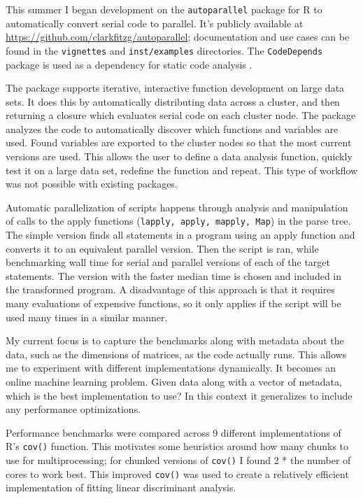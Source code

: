 \documentclass[12pt]{article}
\begin{document}
This summer I began development on the \texttt{autoparallel} package for R
to automatically convert serial code to parallel. It's publicly available
at \url{https://github.com/clarkfitzg/autoparallel}; documentation and use
cases can be found in the \texttt{vignettes} and \texttt{inst/examples}
directories. The \texttt{CodeDepends} package is used as a dependency for
static code analysis \cite{R-CodeDepends}.

The package supports iterative, interactive function development on large
data sets. It does this by automatically distributing data across a
cluster, and then returning a closure which evaluates serial code on each
cluster node. The package analyzes the code to
automatically discover which functions and variables are used. Found
variables are exported to the cluster nodes so that the most current
versions are used. This allows the user to define a data analysis function,
quickly test it on a large data set, redefine the function and repeat.
This type of workflow was not possible with existing packages.

Automatic parallelization of scripts happens through analysis and
manipulation of calls to the apply functions (\texttt{lapply, apply,
mapply, Map}) in the parse tree. The simple version finds all statements in
a program using an apply function and converts it to an equivalent parallel
version. Then the script is ran, while benchmarking wall time for serial
and parallel versions of each of the target statements. The version with
the faster median time is chosen and included in the transformed program.
A disadvantage of this approach is that it requires many evaluations of
expensive functions, so it only applies if the script will be used many
times in a similar manner.

My current focus is to capture the benchmarks along with metadata about the
data, such as the dimensions of matrices, as the code actually runs.
This allows me to experiment with different implementations dynamically.
It becomes an online machine learning problem. Given data along with a
vector of metadata, which is the best implementation to use? In this
context it generalizes to include any performance optimizations.

Performance benchmarks were compared across 9 different implementations of
R's \texttt{cov()} function. This motivates some heuristics around how many
chunks to use for multiprocessing; for chunked versions of \texttt{cov()} I
found 2 * the number of cores to work best. This improved \texttt{cov()}
was used to create a relatively efficient implementation of fitting linear discriminant
analysis.

\hfill


 
\end{document}

